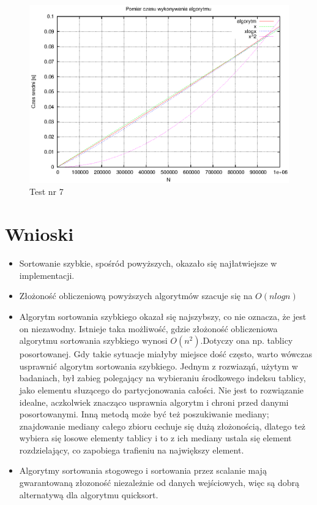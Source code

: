 \documentclass[a4paper,11pt]{article}
\begin{document}
\begin{enumerate}
\begin{table}[th]
\begin{tabular}{l|l|l}
\hline
    \end{tabular}
    \end{table}
    \newpage
 \begin{figure}[!h]
\centering
\includegraphics[width=1\textwidth]{../prj/wykres73.eps}
\caption{Test nr 7}
\label{Test nr 7}
\end{figure} 
\newpage
\section{Wnioski}
\begin{itemize}
 \item Sortowanie szybkie, spośród powyższych, okazało się najłatwiejsze w implementacji.
 \item Złożoność obliczeniową powyższych algorytmów szacuje się na $ O(n logn) $
 \item Algorytm sortowania szybkiego okazał się najszybszy, co nie oznacza, że jest on niezawodny. Istnieje taka możliwość, gdzie złożoność obliczeniowa 
 algorytmu sortowania szybkiego wynosi $ O(n^{2}) $.Dotyczy ona np. tablicy posortowanej. Gdy takie sytuacje miałyby miejsce dość często, warto wówczas usprawnić algorytm sortowania szybkiego. Jednym z rozwiaząń, użytym w badaniach, był zabieg 
 polegający na wybieraniu środkowego indeksu tablicy, jako elementu słuzącego do partycjonowania całości. Nie jest to rozwiązanie idealne, aczkolwiek znacząco usprawnia algorytm i chroni przed 
 danymi posortowanymi. Inną metodą może być też poszukiwanie mediany; znajdowanie mediany całego zbioru cechuje się dużą złożonością, dlatego też 
 wybiera się losowe elementy tablicy i to z ich mediany ustala się element rozdzielający, co zapobiega trafieniu na największy element.
 \item Algorytmy sortowania stogowego i sortowania przez scalanie mają gwarantowaną złozoność niezależnie od danych wejściowych, więc
 są dobrą alternatywą dla algorytmu quicksort.
\end{itemize}


\end{enumerate}
\end{document}

